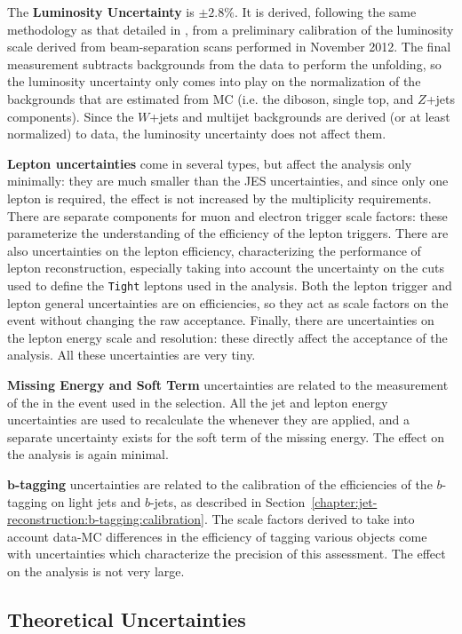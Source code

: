 	The \textbf{Luminosity Uncertainty} is $\pm2.8\%$. It is derived, following the same methodology as that detailed in \cite{ATLASLumi}, from a preliminary calibration of the luminosity scale derived from beam-separation scans performed in November 2012. The final measurement subtracts backgrounds from the data to perform the unfolding, so the luminosity uncertainty only comes into play on the normalization of the backgrounds that are estimated from MC (i.e. the diboson, single top, and $Z$+jets components). Since the $W$+jets and multijet backgrounds are derived (or at least normalized) to data, the luminosity uncertainty does not affect them.

	\textbf{Lepton uncertainties} come in several types, but affect the analysis only minimally: they are much smaller than the JES uncertainties, and since only one lepton is required, the effect is not increased by the multiplicity requirements. There are separate components for muon and electron trigger scale factors: these parameterize the understanding of the efficiency of the lepton triggers. There are also uncertainties on the lepton efficiency, characterizing the performance of lepton reconstruction, especially taking into account the uncertainty on the cuts used to define the \texttt{Tight} leptons used in the analysis. Both the lepton trigger and lepton general uncertainties are on efficiencies, so they act as scale factors on the event without changing the raw acceptance. Finally, there are uncertainties on the lepton energy scale and resolution: these directly affect the acceptance of the analysis. All these uncertainties are very tiny.

	\textbf{Missing Energy and Soft Term} uncertainties are related to the measurement of the \met in the event used in the selection. All the jet and lepton energy uncertainties are used to recalculate the \met whenever they are applied, and a separate uncertainty exists for the soft term of the missing energy. The effect on the analysis is again minimal.

	\textbf{$\mathbf{b}$-tagging} uncertainties are related to the calibration of the efficiencies of the $b$-tagging on light jets and $b$-jets, as described in Section~\ref{chapter:jet-reconstruction:b-tagging:calibration}. The scale factors derived to take into account data-MC differences in the efficiency of tagging various objects come with uncertainties which characterize the precision of this assessment. The effect on the analysis is not very large.


	\subsection{Theoretical Uncertainties}
	\label{chapter:color:uncertainties:theory}

